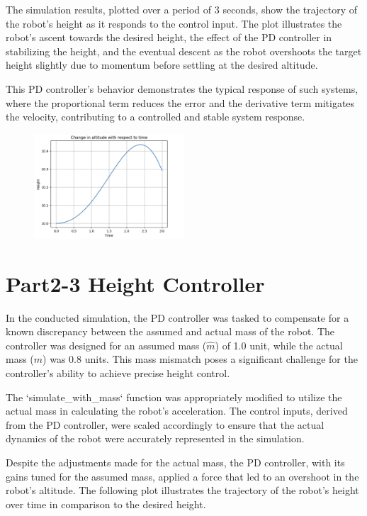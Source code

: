 \documentclass[letterpaper, 10 pt, conference]{ieeeconf}  %
\begin{document}
The simulation results, plotted over a period of 3 seconds, show the trajectory of the robot's height as it responds to the control input. The plot illustrates the robot's ascent towards the desired height, the effect of the PD controller in stabilizing the height, and the eventual descent as the robot overshoots the target height slightly due to momentum before settling at the desired altitude.

This PD controller's behavior demonstrates the typical response of such systems, where the proportional term reduces the error and the derivative term mitigates the velocity, contributing to a controlled and stable system response.

\begin{figure}[htbp]
    \centering
    \includegraphics[width=0.5\textwidth]{image5.png}
    \label{fig:enter-label}
\end{figure}

\section{Part2-3 Height Controller}

In the conducted simulation, the PD controller was tasked to compensate for a known discrepancy between the assumed and actual mass of the robot. The controller was designed for an assumed mass (\( \hat{m} \)) of 1.0 unit, while the actual mass (\( m \)) was 0.8 units. This mass mismatch poses a significant challenge for the controller's ability to achieve precise height control.

The `simulate\_with\_mass` function was appropriately modified to utilize the actual mass in calculating the robot's acceleration. The control inputs, derived from the PD controller, were scaled accordingly to ensure that the actual dynamics of the robot were accurately represented in the simulation.

Despite the adjustments made for the actual mass, the PD controller, with its gains tuned for the assumed mass, applied a force that led to an overshoot in the robot's altitude. The following plot illustrates the trajectory of the robot's height over time in comparison to the desired height.
\end{document}
